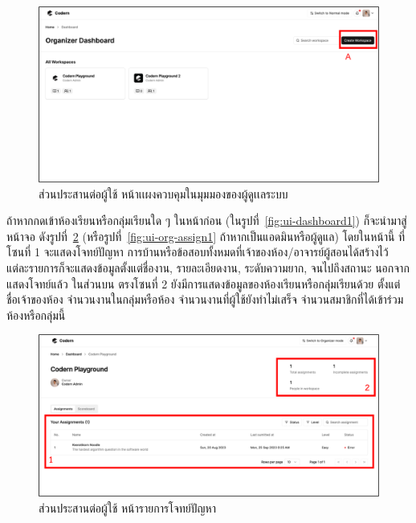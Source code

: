 \documentclass[12pt,oneside,openright,a4paper]{cpe-thai-project}
\begin{document}
    \hypertarget{ui-org-dashboard1}{
        \begin{figure}[H]
        \centering
            \includegraphics[width=15cm]{figure/ui/ui-org-dashboard1.png}
            \caption[ส่วนประสานต่อผู้ใช้ หน้าเเผงควบคุมของผู้ดูเเลระบบ]{ส่วนประสานต่อผู้ใช้ หน้าเเผงควบคุมในมุมมองของผู้ดูเเลระบบ}
            \label{fig:ui-org-dashboard1}
        \end{figure}
    }
    \begin{flushleft}
    ถ้าหากกดเข้าห้องเรียนหรือกลุ่มเรียนใด ๆ ในหน้าก่อน (ในรูปที่~\ref{fig:ui-dashboard1}) ก็จะนำมาสู่หน้าจอ ดังรูปที่~\ref{fig:ui-assign1} (หรือรูปที่~\ref{fig:ui-org-assign1} ถ้าหากเป็นแอดมินหรือผู้ดูแล) โดยในหน้านี้ ที่โซนที่ 1 จะแสดงโจทย์ปัญหา การบ้านหรือข้อสอบทั้งหมดที่เจ้าของห้อง/อาจารย์ผู้สอนได้สร้างไว้ แต่ละรายการก็จะแสดงข้อมูลตั้งแต่ชื่องาน, รายละเอียดงาน, ระดับความยาก, จนไปถึงสถานะ นอกจากแสดงโจทย์แล้ว ในส่วนบน ตรงโซนที่ 2 ยังมีการแสดงข้อมูลของห้องเรียนหรือกลุ่มเรียนด้วย ตั้งแต่ชื่อเจ้าของห้อง จำนวนงานในกลุ่มหรือห้อง จำนวนงานที่ผู้ใช้ยังทำไม่เสร็จ จำนวนสมาชิกที่ได้เข้าร่วมห้องหรือกลุ่มนี้
    \end{flushleft}

    \hypertarget{ui-assign1}{
        \begin{figure}[H]
        \centering
            \includegraphics[width=15cm]{figure/ui/ui-assign1.png}
            \caption[ส่วนประสานต่อผู้ใช้ หน้ารายการโจทย์ปัญหา]{ส่วนประสานต่อผู้ใช้ หน้ารายการโจทย์ปัญหา}
            \label{fig:ui-assign1}
        \end{figure}
    }
    
\end{document}

